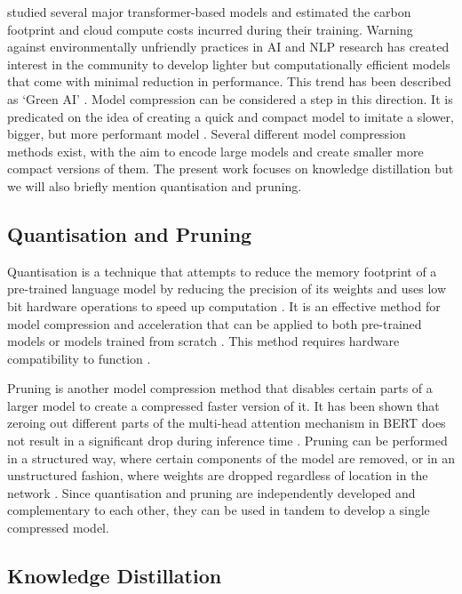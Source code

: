 \documentclass{article}
\begin{document}
\citet{strubell2019energy} studied several major transformer-based models and estimated the carbon footprint and cloud compute costs incurred during their training.  Warning against environmentally unfriendly practices in AI and NLP research has created interest in the community to develop lighter but computationally efficient models that come with minimal reduction in performance. This trend has been described as `Green AI' \citep{schwartz2020green}. Model compression can be considered a step in this direction. It is predicated on the idea of creating a quick and compact model to imitate a slower, bigger, but more performant model \citep{bucilua2006model}. Several different model compression methods exist, with the aim to encode large models and create smaller more compact versions of them. The present work focuses on knowledge distillation but we will also briefly mention quantisation and pruning. 

\subsection{Quantisation and Pruning}

Quantisation is a technique that attempts to reduce the memory footprint of a pre-trained language model by reducing the precision of its weights and uses low bit hardware operations to speed up computation \citep{shen2020q}. It is an effective method for model compression and acceleration that can be applied to both pre-trained models or models trained from scratch \citep{cheng2017survey}. This method requires hardware compatibility to function \citep{rogers2020primer}. 

Pruning is another model compression method that disables certain parts of a larger model to create a compressed faster version of it. It has been shown that zeroing out different parts of the multi-head attention mechanism in BERT does not result in a significant drop during inference time \citep{michel2019sixteen}. Pruning can be performed in a structured way, where certain components of the model are removed, or in an unstructured fashion, where weights are dropped regardless of location in the network \citep{rogers2020primer}. Since quantisation and pruning are independently developed and complementary to each other, they can be used in tandem to develop a single compressed model. 

\subsection{Knowledge Distillation}
\end{document}
